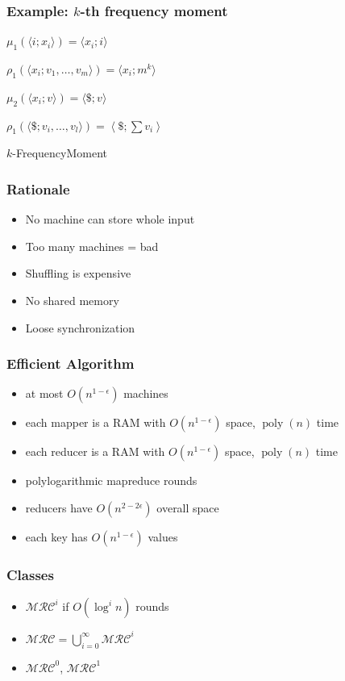 \documentclass[12pt,aspectratio=169]{beamer}
\DeclareMathOperator{\poly}{\text{poly}}
\begin{document}
\begin{frame}\frametitle{Example: $k$-th frequency moment}
\begin{algorithm}[H]

$\mu_{1}(\langle i; x_{i} \rangle) = \langle x_{i}; i \rangle$\;

$\rho_{1}  (\langle x_{i} ; {v_{1} , \ldots , v_{m}} \rangle) = \langle x_{i} ;
m^{k}\rangle$\;

$\mu_{2}(\langle x_{i} ; v \rangle) = \langle \$ ; v \rangle$\;

$\rho_{1}  (\langle \$ ; {v_{i} , \ldots , v_{l}} \rangle) = \left\langle \$
; \sum v_{i} \right\rangle $\;
\caption{$k$-FrequencyMoment}
\end{algorithm}
\end{frame}

\begin{frame}\frametitle{Rationale}
\begin{itemize}
\item
  No machine can store whole input
\item
  Too many machines = \alert{bad}
\item
  Shuffling is expensive
\item
  No shared memory
\item
  Loose synchronization
\end{itemize}
\end{frame}

\begin{frame}\frametitle{Efficient Algorithm}
\begin{itemize}
\item
  at most  $O(n^{1-\epsilon})$ machines
\item
  each mapper is a RAM with $O(n^{1-\epsilon})$ space, $\poly(n)$ time
\item
  each reducer is a RAM with $O(n^{1-\epsilon})$ space, $\poly(n)$ time
\item
  polylogarithmic mapreduce rounds
\item
  reducers have $O(n^{2-2\epsilon})$ overall space
\item
  each key has $O(n^{1-\epsilon})$ values
\end{itemize}
\end{frame}

\begin{frame}\frametitle{Classes}
\begin{itemize}
\item
$\mathcal{MRC}^{i}$ if $O(\log^{i}n)$ rounds
\item
$\mathcal{MRC} = \bigcup_{i=0}^{\infty}\mathcal{MRC}^{i}$
\item
$\mathcal{MRC}^{0}$, $\mathcal{MRC}^{1}$
\end{itemize}
\end{frame}
\end{document}

